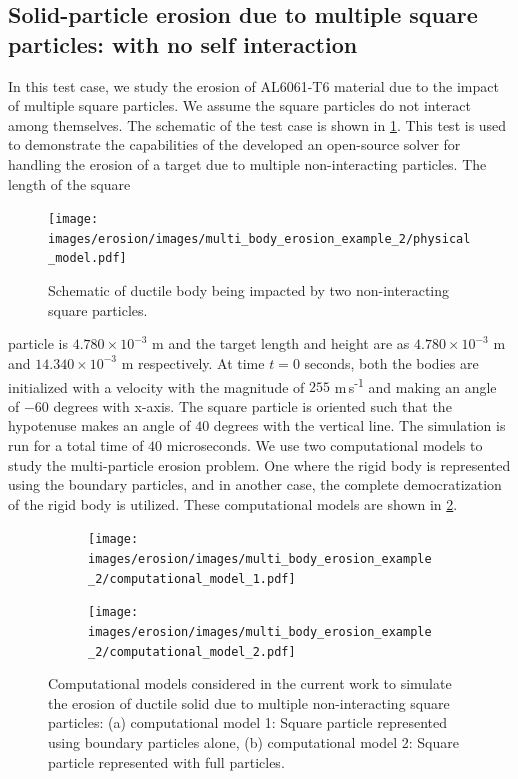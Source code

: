 \subsection{Solid-particle erosion due to multiple square particles: with no self
  interaction}
\label{sec:res:mpe-2}
In this test case, we study the erosion of AL6061-T6 material due to the
impact of multiple square particles. We assume the square particles do not
interact among themselves. The schematic of the test case is shown in
\cref{fig:mpe-2-pm}. This test is used to demonstrate the capabilities of the
developed an open-source solver for handling the erosion of a target due to multiple
non-interacting particles. The length of the square
\begin{figure}[!htpb]
  \centering
  \texttt{[image: images/erosion/images/multi\_body\_erosion\_example\_2/physical\_model.pdf]}
  \caption{Schematic of ductile body being impacted by two non-interacting
    square particles.}
\label{fig:mpe-2-pm}
\end{figure}
particle is $4.780 \times 10^{-3}$ m and the target length and height are as
$4.780 \times 10^{-3}$ m and $14.340 \times 10^{-3}$ m respectively. At time
$t=0$ seconds, both the bodies are initialized with a velocity with the magnitude of
$255$ m\,s\textsuperscript{-1} and making an angle of $-60$ degrees with x-axis.
The square particle is oriented such that the hypotenuse makes an angle of $40$
degrees with the vertical line. The simulation is run for a total time of $40$
microseconds. We use two computational models to study the multi-particle
erosion problem. One where the rigid body is represented using the boundary
particles, and in another case, the complete democratization of the rigid body
is utilized. These computational models are shown in
\cref{fig:mpe-2-cm}.
\begin{figure}[!htpb]
  \centering
  \begin{subfigure}{0.48\textwidth}
    \centering
    \texttt{[image: images/erosion/images/multi\_body\_erosion\_example\_2/computational\_model\_1.pdf]}
    \subcaption{}
  \end{subfigure}
  \begin{subfigure}{0.48\textwidth}
    \centering
    \texttt{[image: images/erosion/images/multi\_body\_erosion\_example\_2/computational\_model\_2.pdf]}
    \subcaption{}
  \end{subfigure}
  \caption{Computational models considered in the current work to simulate the
    erosion of ductile solid due to multiple non-interacting square particles:
    (a) computational model 1: Square particle represented using boundary particles alone,
    (b) computational model 2: Square particle represented with full particles.}
\label{fig:mpe-2-cm}
\end{figure}
